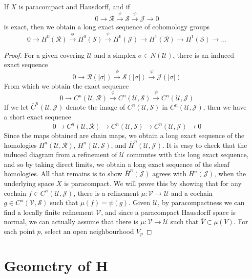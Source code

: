 \begin{theorem}
    If $X$ is paracompact and Hausdorff, and if
    \[ 0 \to \mathcal{R} \xrightarrow{\phi} \mathcal{S} \xrightarrow{\psi} \mathcal{J} \to 0 \]
    is exact, then we obtain a long exact sequence of cohomology groups
    \[ 0 \to H^0(\mathcal{R}) \xrightarrow{\phi} H^0(\mathcal{S}) \xrightarrow{\psi} H^0(\mathcal{J}) \to H^1(\mathcal{R}) \to H^1(\mathcal{S}) \to \dots \]
\end{theorem}
\begin{proof}
    For a given covering $\mathcal{U}$ and a simplex $\sigma \in N(\mathcal{U})$, there is an induced exact sequence
    \[ 0 \to \mathcal{R}(|\sigma|) \xrightarrow{\phi} \mathcal{S}(|\sigma|) \xrightarrow{\psi} \mathcal{J}(|\sigma|) \]
    From which we obtain the exact sequence
    \[ 0 \to C^n(\mathcal{U},\mathcal{R}) \xrightarrow{\phi} C^n(\mathcal{U},\mathcal{S}) \xrightarrow{\psi} C^n(\mathcal{U}, \mathcal{J})  \]
    If we let $\overline{C}^n(\mathcal{U}, \mathcal{J})$ denote the image of $C^n(\mathcal{U}, \mathcal{S})$ in $C^n(\mathcal{U}, \mathcal{J})$, then we have a short exact sequence
    \[ 0 \to C^n(\mathcal{U},\mathcal{R}) \to C^n(\mathcal{U},\mathcal{S}) \to \overline{C^n}(\mathcal{U}, \mathcal{J}) \to 0 \]
    Since the maps obtained are chain maps, we obtain a long exact sequence of the homologies $H^n(\mathcal{U}, \mathcal{R})$, $H^n(\mathcal{U}, \mathcal{S})$, and $\overline{H}^n(\mathcal{U}, \mathcal{J})$. It is easy to check that the induced diagram from a refinement of $\mathcal{U}$ commutes with this long exact sequence, and so by taking direct limits, we obtain a long exact sequence of the sheaf homologies. All that remains is to show $\overline{H}^n(\mathcal{J})$ agrees with $H^n(\mathcal{J})$, when the underlying space $X$ is paracompact. We will prove this by showing that for any cochain $f \in C^n(\mathcal{U},\mathcal{J})$, there is a refinement $\mu: \mathcal{V} \to \mathcal{U}$ and a cochain $g \in C^n(\mathcal{V},\mathcal{S})$ such that $\mu(f) = \psi(g)$. Given $\mathcal{U}$, by paracompactness we can find a locally finite refinement $\mathcal{V}$, and since a paracompact Hausdorff space is normal, we can actually assume that there is $\mu: \mathcal{V} \to \mathcal{U}$ such that $\overline{V} \subset \mu(V)$. For each point $p$, select an open neighbourhood $V_p$
\end{proof}

\section{Geometry of $\mathbf{H}$}

